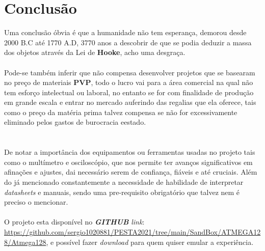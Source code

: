 \chapter{Conclusão}
Uma conclusão óbvia é que a humanidade não tem esperança, demorou desde 2000 B.C até 1770 A.D, 3770 anos a descobrir de que se podia deduzir a massa dos objetos através da Lei de \textbf{Hooke}, acho uma desgraça.
\\
\\
Pode-se também inferir que não compensa desenvolver projetos que se basearam no preço de materiais \textbf{PVP}, todo o lucro vai para a área comercial na qual não tem esforço intelectual ou laboral, no entanto se for com finalidade de produção em grande escala e entrar no mercado auferindo das regalias que ela oferece, tais como o preço da matéria prima talvez compensa se não for excessivamente eliminado pelos gastos de burocracia eestado. \\
\\
\\
De notar a importância dos equipamentos ou ferramentas usadas no projeto tais como o multímetro e osciloscópio, que nos permite ter avanços significativos em afinações e ajustes, dai necessário serem de confiança, fiáveis e até cruciais. Além do já mencionado constantemente a necessidade de habilidade de interpretar \textit{datasheets} e manuais, sendo uma pre-requisito obrigatório que talvez nem é preciso o mencionar.
\\
\\
O projeto esta disponível no \textit{\textbf{GITHUB}} \textit{link}: \url{https://github.com/sergio1020881/PESTA2021/tree/main/SandBox/ATMEGA128/Atmega128}, e possível fazer \textit{download} para quem quiser emular a experiência.




